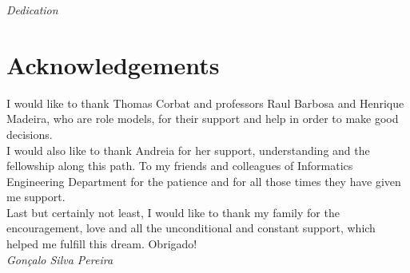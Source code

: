 
\pagestyle{empty}
\begin{center}

\emph{Dedication}

\end{center}

\clearpage
\section*{Acknowledgements}

I would like to thank Thomas Corbat and professors Raul Barbosa and Henrique Madeira, who are role models, for their support and help in order to make good decisions.\\

I would also like to thank Andreia for her support, understanding and the fellowship along this path. To my friends and colleagues of Informatics Engineering Department for the patience and for all those times they have given me support. \\

Last but certainly not least, I would like to thank my family for the encouragement, love and all the unconditional and constant support, which helped me fulfill this dream. Obrigado!\\



\emph{\hfill Gonçalo Silva Pereira}

\clearpage

\vspace*{\fill}
\pagestyle{empty}



